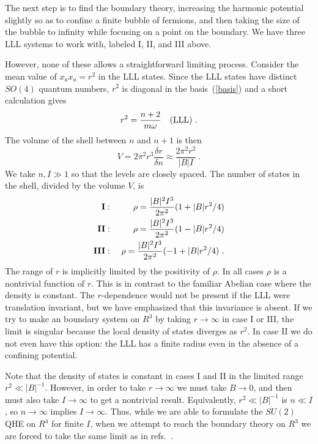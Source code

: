 \documentclass[a4paper,12pt]{article}
\newcommand{\R}{R}
\begin{document}
The next step is to find the boundary theory, increasing the harmonic
potential slightly so as to confine a finite bubble of fermions, and
then taking the size of the bubble to infinity while focusing on a
point on the boundary.  We have three LLL systems to work with, labeled
I, II, and III above.  

However, none
of these allows a straightforward limiting process. Consider the mean value of
$x_a x_a = r^2$ in the LLL states.  Since the LLL states have distinct
$SO(4)$ quantum numbers, $r^2$ is diagonal in the basis~(\ref{basis}) and a
short calculation gives
\begin{equation}
r^2 = \frac{n+2}{m\omega} \quad({\rm LLL})\ .
\end{equation}
The volume of the shell between $n$ and $n+1$ is then
\begin{equation}
V = 2\pi^2 r^3 \frac{\delta r}{\delta n} \approx \frac{2\pi^2 r^2}{|B|I}\ .
\label{volume}
\end{equation}
We take $n, I \gg 1$ so that the levels are closely spaced.  The
number of states in the shell, divided by the volume $V$, is
\begin{eqnarray}
{\bf I}:&&\ \rho= \frac{|B|^2 I^3}{2\pi^2} (1 + |B| r^2/4) \nonumber\\
{\bf II}:&&\ \rho=\frac{|B|^2 I^3}{2\pi^2} (1 - |B| r^2/4) \nonumber\\
{\bf III}:&&\ \rho=\frac{|B|^2 I^3}{2\pi^2} (-1+|B| r^2/4) \ .
\label{nstates}
\end{eqnarray}
The range of $r$ is implicitly limited by the positivity of $\rho$.
In all cases $\rho$ is a nontrivial function of $r$.  This is in contrast
to the familiar Abelian case where the density is constant.  The
$r$-dependence would not be present if the LLL were translation invariant,
but we have emphasized that this invariance is absent.
If we try to make an boundary system on $\R^3$ by taking $r \to \infty$ in case
I or III, the limit is singular because the local density of states diverges as
$r^2$.  In case II we do not even have this option: the LLL has a finite
radius even in the absence of a confining potential.

Note that
the density of states is constant in cases I and II in the limited range
$r^2 \ll |B|^{-1}$.  However, in order to take $r \to \infty$ we must take
$B \to 0$, and then must also take $I \to \infty$ to get a nontrivial result.
Equivalently, $r^2 \ll |B|^{-1}$ is $n \ll I$, so $n \to \infty$ implies $I
\to\infty$.  Thus, while we are able to formulate the $SU(2)$ QHE on $\R^4$
for finite
$I$, when we attempt to reach the boundary theory on $\R^3$ we are forced to
take the same limit as in refs.~\cite{hz1,hz2}.  
\end{document}
